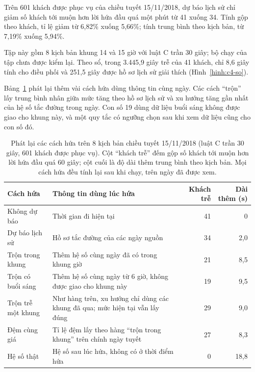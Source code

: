 Trên 601 khách được phục vụ của chiều tuyết 15/11/2018, dự báo lịch sử chỉ giảm số khách tới muộn hơn lời hứa đầu
quá một phút từ 41 xuống 34. Tính gộp theo khách, tỉ lệ giảm từ 6,82\% xuống 5,66\%; tính trung bình theo kịch bản,
từ 7,19\% xuống 5,94\%.

Tập này gồm 8 kịch bản khung 14 và 15 giờ với luật C trần 30 giây; bộ chạy của tập chưa được kiểm lại. Theo sổ, trong
3.445,9 giây trễ của 41 khách, chỉ 8,6 giây tính cho điều phối và 251,5 giây được hồ sơ lịch sử giải thích
(Hình~\ref{hinh:c4-so}).

Bảng~\ref{bang:c4-tuyet} phát lại thêm vài cách hứa dùng thông tin cùng ngày. Các cách ``trộn'' lấy trung bình nhân
giữa mức tăng theo hồ sơ lịch sử và xu hướng tăng gần nhất của hệ số tắc đường trong ngày. Con số 19 dùng dữ liệu
buổi sáng không được giao cho khung này, và một quy tắc có ngưỡng chọn sau khi xem dữ liệu cũng cho con số đó.

\begin{table}[htbp]
\centering
\caption{Phát lại các cách hứa trên 8 kịch bản chiều tuyết 15/11/2018 (luật C trần 30 giây, 601 khách được phục
vụ). Cột ``khách trễ'' đếm gộp số khách tới muộn hơn lời hứa đầu quá 60 giây; cột cuối là độ dài thêm trung bình
theo kịch bản. Mọi cách hứa đều tính lại sau khi chạy, trên ngày đã được xem.}
\label{bang:c4-tuyet}
\small
\begin{tabular}{@{}p{3.6cm}p{7.0cm}rr@{}}
\toprule
\textbf{Cách hứa} & \textbf{Thông tin dùng lúc hứa} & \textbf{Khách trễ} & \textbf{Dài thêm (s)}\\
\midrule
Không dự báo & Thời gian đi hiện tại & 41 & 0\\
Dự báo lịch sử & Hồ sơ tắc đường của các ngày nguồn & 34 & 2,0\\
Trộn trong khung & Thêm hệ số cùng ngày đã có trong khung giờ & 21 & 8,5\\
Trộn có buổi sáng & Thêm hệ số cùng ngày từ 6 giờ, không được giao cho khung này & 19 & 9,5\\
Trộn trễ một khung & Như hàng trên, xu hướng chỉ dùng các khung đã qua; mức hiện tại vẫn lấy đúng & 29 & 9,0\\
Đệm cùng giá & Tỉ lệ đệm lấy theo hàng ``trộn trong khung'' trên chính ngày tuyết & 27 & 8,3\\
Hệ số thật & Hệ số sau lúc hứa, không có ở thời điểm hứa & 0 & 18,8\\
\bottomrule
\end{tabular}
\end{table}

